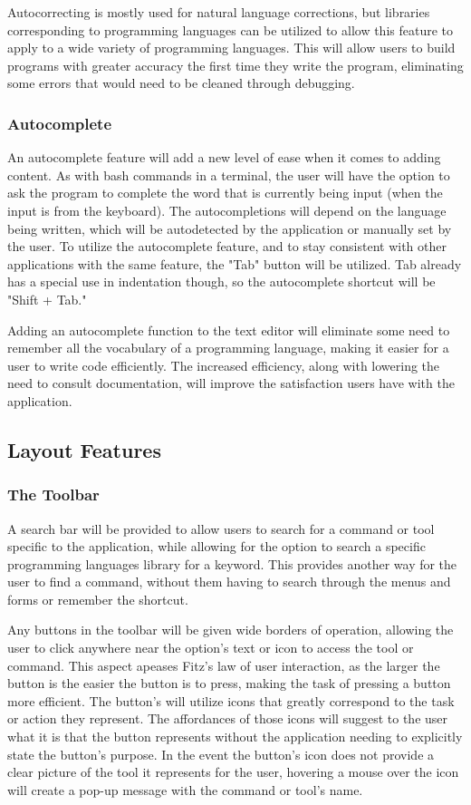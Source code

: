 \documentclass[11pt, oneside]{article}
\begin{document}
Autocorrecting is mostly used for natural language corrections, but libraries corresponding to programming languages can be utilized to allow this feature to apply to a wide variety of programming languages. This will allow users to build programs with greater accuracy the first time they write the program, eliminating some errors that would need to be cleaned through debugging. 

\subsubsection{Autocomplete}
An autocomplete feature will add a new level of ease when it comes to adding content. As with bash commands in a terminal, the user will have the option to ask the program to complete the word that is currently being input (when the input is from the keyboard). The autocompletions will depend on the language being written, which will be autodetected by the application or manually set by the user. To utilize the autocomplete feature, and to stay consistent with other applications with the same feature, the "Tab" button will be utilized. Tab already has a special use in indentation though, so the autocomplete shortcut will be "Shift + Tab."

Adding an autocomplete function to the text editor will eliminate some need to remember all the vocabulary of a programming language, making it easier for a user to write code efficiently. The increased efficiency, along with lowering the need to consult documentation, will improve the satisfaction users have with the application. 

\subsection{Layout Features}
\subsubsection{The Toolbar}
A search bar will be provided to allow users to search for a command or tool specific to the application, while allowing for the option to search a specific programming languages library for a keyword. This provides another way for the user to find a command, without them having to search through the menus and forms or remember the shortcut. 

Any buttons in the toolbar will be given wide borders of operation, allowing the user to click anywhere near the option's text or icon to access the tool or command. This aspect apeases Fitz's law of user interaction, as the larger the button is the easier the button is to press, making the task of pressing a button more efficient. The button's will utilize icons that greatly correspond to the task or action they represent. The affordances of those icons will suggest to the user what it is that the button represents without the application needing to explicitly state the button's purpose. In the event the button's icon does not provide a clear picture of the tool it represents for the user, hovering a mouse over the icon will create a pop-up message with the command or tool's name. 
\end{document}
